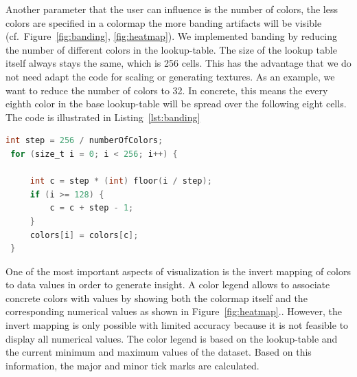 Another  parameter that the user can influence is the  number of colors, the less colors are specified in a colormap the more banding artifacts will be visible (cf.~Figure~\ref{fig:banding}, \ref{fig:heatmap}). 
We implemented banding by reducing the number of different colors in the lookup-table. The size of the lookup table itself always stays the same, which is 256 cells. This has the advantage that we do not need adapt the code for scaling or generating textures. 
As an example, we want to reduce the number of colors to 32. In concrete, this means the every eighth color in the base lookup-table will be spread over the following eight cells. The code is illustrated in Listing~\ref{lst:banding}


\begin{lstlisting}[language=C,label=lst:banding,caption={Reducing the number of colors in the lookup-table}]
int step = 256 / numberOfColors;
 for (size_t i = 0; i < 256; i++) {

     int c = step * (int) floor(i / step);
     if (i >= 128) {
         c = c + step - 1;
     }
     colors[i] = colors[c];
 }
 \end{lstlisting}

One of the most important aspects of visualization is the invert mapping of colors to data values in order to generate insight. A color legend allows to associate concrete colors with values by showing both the colormap itself and the corresponding numerical values as shown in Figure~\ref{fig:heatmap}.. However, the invert mapping is only possible with limited accuracy because it is not feasible to display all numerical values. The color legend is based on the lookup-table and the current minimum and maximum values of the dataset. Based on this information, the major and minor tick marks are calculated.


